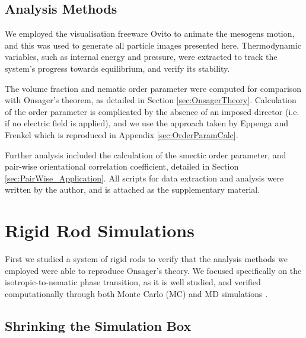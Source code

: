 \documentclass[11pt, a4paper]{article} %
\begin{document}
 
\subsection{Analysis Methods}
We employed the visualisation freeware Ovito \cite{Ovito} to animate the mesogens motion, and this was used to generate all particle images presented here. Thermodynamic variables, such as internal energy and pressure, were extracted to track the system's progress towards equilibrium, and verify its stability.

The volume fraction and nematic order parameter were computed for comparison with Onsager's theorem, as detailed in Section \ref{sec:OnsagerTheory}. Calculation of the order parameter is complicated by the absence of an imposed director (i.e. if no electric field is applied), and we use the approach taken by Eppenga and Frenkel \cite{Eppenga1984} which is reproduced in Appendix \ref{sec:OrderParamCalc}. %

Further analysis included the calculation of the smectic order parameter, and pair-wise orientational correlation coefficient, detailed in Section \ref{sec:PairWise_Application}. All scripts for data extraction and analysis were written by the author, and is attached as the supplementary material.



\section{Rigid Rod Simulations} \label{sec:RigidRodSims}

First we studied a system of rigid rods to verify that the analysis methods we employed were able to reproduce Onsager's theory. We focused specifically on the isotropic-to-nematic phase transition, as it is well studied, and verified computationally through both Monte Carlo (MC) \cite{Frenkel1984, Lee1987} and MD simulations \cite{Allen1987, Camp1996}.


\subsection{Shrinking the Simulation Box}
\end{document}
